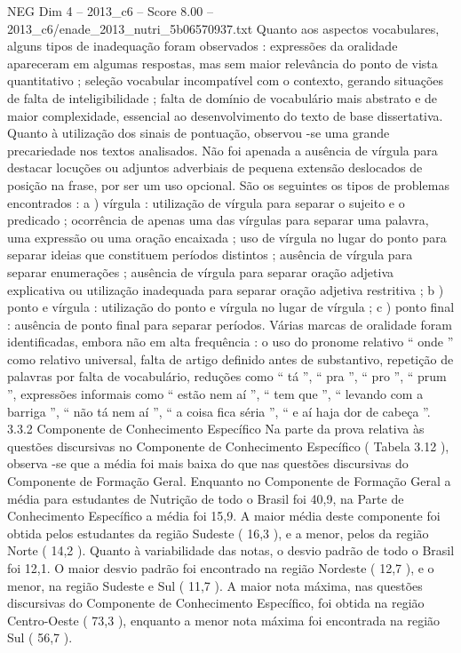 \begin{textsample}{NEG Dim 4 – 2013\_c6 – Score 8.00 – 2013\_c6/enade\_2013\_nutri\_5b06570937.txt}
Quanto aos aspectos vocabulares, alguns tipos de inadequação foram observados : expressões da oralidade apareceram em algumas respostas, mas sem maior relevância do ponto de vista quantitativo ; seleção vocabular incompatível com o contexto, gerando situações de falta de inteligibilidade ; falta de domínio de vocabulário mais abstrato e de maior complexidade, essencial ao desenvolvimento do texto de base dissertativa.
Quanto à utilização dos sinais de pontuação, observou -se uma grande precariedade nos textos analisados.
Não foi apenada a ausência de vírgula para destacar locuções ou adjuntos adverbiais de pequena extensão deslocados de posição na frase, por ser um uso opcional.
São os seguintes os tipos de problemas encontrados : a ) vírgula : utilização de vírgula para separar o sujeito e o predicado ; ocorrência de apenas uma das vírgulas para separar uma palavra, uma expressão ou uma oração encaixada ; uso de vírgula no lugar do ponto para separar ideias que constituem períodos distintos ; ausência de vírgula para separar enumerações ; ausência de vírgula para separar oração adjetiva explicativa ou utilização inadequada para separar oração adjetiva restritiva ; b ) ponto e vírgula : utilização do ponto e vírgula no lugar de vírgula ; c ) ponto final : ausência de ponto final para separar períodos.
Várias marcas de oralidade foram identificadas, embora não em alta frequência : o uso do pronome relativo “ onde ” como relativo universal, falta de artigo definido antes de substantivo, repetição de palavras por falta de vocabulário, reduções como “ tá ”, “ pra ”, “ pro ”, “ prum ”, expressões informais como “ estão nem aí ”, “ tem que ”, “ levando com a barriga ”, “ não tá nem aí ”, “ a coisa fica séria ”, “ e aí haja dor de cabeça ”. 3.3.2 Componente de Conhecimento Específico Na parte da prova relativa às questões discursivas no Componente de Conhecimento Específico ( Tabela 3.12 ), observa -se que a média foi mais baixa do que nas questões discursivas do Componente de Formação Geral.
Enquanto no Componente de Formação Geral a média para estudantes de Nutrição de todo o Brasil foi 40,9, na Parte de Conhecimento Específico a média foi 15,9.
A maior média deste componente foi obtida pelos estudantes da região Sudeste ( 16,3 ), e a menor, pelos da região Norte ( 14,2 ).
Quanto à variabilidade das notas, o desvio padrão de todo o Brasil foi 12,1.
O maior desvio padrão foi encontrado na região Nordeste ( 12,7 ), e o menor, na região Sudeste e Sul ( 11,7 ).
A maior nota máxima, nas questões discursivas do Componente de Conhecimento Específico, foi obtida na região Centro-Oeste ( 73,3 ), enquanto a menor nota máxima foi encontrada na região Sul ( 56,7 ).

\end{textsample}

